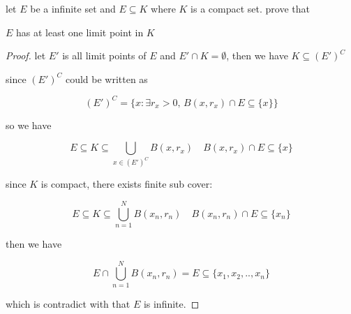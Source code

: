 \documentclass[11pt,a4paper]{article}
\begin{document}
\begin{exercise}
    let $E$ be a infinite set and $E \subseteq K$ where $K$ is a compact set. prove that 

    $E$ has at least one limit point in $K$
\end{exercise}

\begin{proof}
    let  $E'$ is all limit points of $E$ and $E' \cap K = \emptyset$, then we have $K \subseteq (E')^C$

    since $(E')^C$ could be written as

    \[
        (E')^C = \{ x: \exists r_x > 0,\, B(x, r_x) \cap E \subseteq \{ x \} \}
    \]

    so we have

    \[
        E \subseteq K \subseteq \bigcup_{x \in (E')^C} B(x, r_x) \quad B(x, r_x) \cap E \subseteq \{ x \}
    \]

    since $K$ is compact, there exists finite sub cover:


    \[
        E \subseteq K \subseteq \bigcup_{n=1}^{N} B(x_n, r_n) \quad B(x_n, r_n) \cap E \subseteq \{ x_n \}
    \]

    then we have

    \[
        E \cap \bigcup_{n=1}^{N} B(x_n, r_n) = E \subseteq \{ x_1, x_2, .. , x_n \}
    \]

    which is contradict with that $E$ is infinite.
\end{proof}
\end{document}
